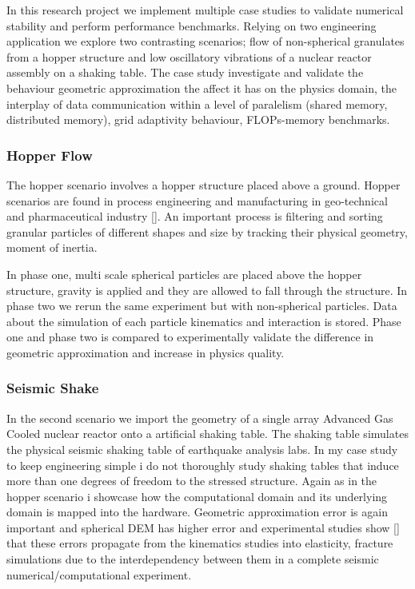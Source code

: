\documentclass[times,12pt]{article}
\begin{document}
In this research project we implement multiple case studies to validate numerical stability and perform performance benchmarks. Relying on two engineering application we explore two contrasting scenarios; flow of non-spherical granulates from a hopper structure and low oscillatory vibrations of a nuclear reactor assembly on a shaking table. The case study investigate and validate the behaviour geometric approximation the affect it has on the physics domain, the interplay of data communication within a level of paralelism (shared memory, distributed memory), grid adaptivity behaviour, FLOPs-memory benchmarks.

\subsubsection{Hopper Flow}

The hopper scenario involves a hopper structure placed above a ground. Hopper scenarios are found in process engineering and manufacturing in geo-technical and pharmaceutical industry []. An important process is filtering and sorting granular particles of different shapes and size by tracking their physical geometry, moment of inertia.

In phase one, multi scale spherical particles are placed above the hopper structure, gravity is applied and they are allowed to fall through the structure. In phase two we rerun the same experiment but with non-spherical particles. Data about the simulation of each particle kinematics and interaction is stored. Phase one and phase two is compared to experimentally validate the difference in geometric approximation and increase in physics quality.

\subsubsection{Seismic Shake}

In the second scenario we import the geometry of a single array Advanced Gas Cooled nuclear reactor onto a artificial shaking table. The shaking table simulates the physical seismic shaking table of earthquake analysis labs. In my case study to keep engineering simple i do not thoroughly study shaking tables that induce more than one degrees of freedom to the stressed structure. Again as in the hopper scenario i showcase how the computational domain and its underlying domain is 
mapped into the hardware. Geometric approximation error is again important and spherical DEM has higher error and experimental studies show [] that these errors propagate from the kinematics studies into elasticity, fracture simulations due to the interdependency between them in a complete seismic numerical/computational experiment.
\end{document}
